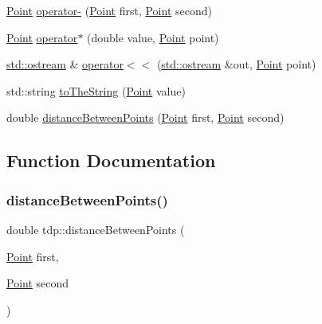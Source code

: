\begin{DoxyCompactItemize}
\item 
\mbox{\hyperlink{structtdp_1_1_point}{Point}} \mbox{\hyperlink{namespacetdp_ab8dc4a4b6272d3a8ef06f22a5b07daec}{operator-\/}} (\mbox{\hyperlink{structtdp_1_1_point}{Point}} first, \mbox{\hyperlink{structtdp_1_1_point}{Point}} second)
\item 
\mbox{\hyperlink{structtdp_1_1_point}{Point}} \mbox{\hyperlink{namespacetdp_ab3a99a4aa6185224eae95e30093c9946}{operator$\ast$}} (double value, \mbox{\hyperlink{structtdp_1_1_point}{Point}} point)
\item 
\mbox{\hyperlink{doctest_8h_a116af65cb5e924b33ad9d9ecd7a783f3}{std\+::ostream}} \& \mbox{\hyperlink{namespacetdp_a40a6deb04f2cc708b0cd33955e23ffb6}{operator$<$$<$}} (\mbox{\hyperlink{doctest_8h_a116af65cb5e924b33ad9d9ecd7a783f3}{std\+::ostream}} \&out, \mbox{\hyperlink{structtdp_1_1_point}{Point}} point)
\item 
std\+::string \mbox{\hyperlink{namespacetdp_ade7149690123950b10455ece39159e94}{to\+The\+String}} (\mbox{\hyperlink{structtdp_1_1_point}{Point}} value)
\item 
double \mbox{\hyperlink{namespacetdp_a05b1894339c9a02c1e9347d3dd6fd07a}{distance\+Between\+Points}} (\mbox{\hyperlink{structtdp_1_1_point}{Point}} first, \mbox{\hyperlink{structtdp_1_1_point}{Point}} second)
\end{DoxyCompactItemize}


\subsection{Function Documentation}
\mbox{\label{namespacetdp_a05b1894339c9a02c1e9347d3dd6fd07a}} 
\subsubsection{\texorpdfstring{distance\+Between\+Points()}{distanceBetweenPoints()}}
{\footnotesize\ttfamily double tdp\+::distance\+Between\+Points (\begin{DoxyParamCaption}\item[{\mbox{\hyperlink{structtdp_1_1_point}{Point}}}]{first,  }\item[{\mbox{\hyperlink{structtdp_1_1_point}{Point}}}]{second }\end{DoxyParamCaption})}

\mbox{\label{namespacetdp_ab1602cb8c233d6ab4a5fa0e12dd219f1}} 
